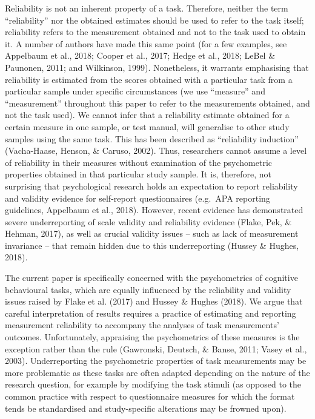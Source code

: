 \documentclass[english,,man,floatsintext]{apa6}
\begin{document}
Reliability is not an inherent property of a task. Therefore, neither the term \enquote{reliability} nor the obtained estimates should be used to refer to the task itself; reliability refers to the measurement obtained and not to the task used to obtain it. A number of authors have made this same point (for a few examples, see Appelbaum et al., 2018; Cooper et al., 2017; Hedge et al., 2018; LeBel \& Paunonen, 2011; and Wilkinson, 1999). Nonetheless, it warrants emphasising that reliability is estimated from the scores obtained with a particular task from a particular sample under specific circumstances (we use \enquote{measure} and \enquote{measurement} throughout this paper to refer to the measurements obtained, and not the task used). We cannot infer that a reliability estimate obtained for a certain measure in one sample, or test manual, will generalise to other study samples using the same task. This has been described as \enquote{reliability induction} (Vacha-Haase, Henson, \& Caruso, 2002). Thus, researchers cannot assume a level of reliability in their measures without examination of the psychometric properties obtained in that particular study sample. It is, therefore, not surprising that psychological research holds an expectation to report reliability and validity evidence for self-report questionnaires (e.g.~APA reporting guidelines, Appelbaum et al., 2018). However, recent evidence has demonstrated severe underreporting of scale validity and reliability evidence (Flake, Pek, \& Hehman, 2017), as well as crucial validity issues -- such as lack of measurement invariance -- that remain hidden due to this underreporting (Hussey \& Hughes, 2018).

The current paper is specifically concerned with the psychometrics of cognitive behavioural tasks, which are equally influenced by the reliability and validity issues raised by Flake et al. (2017) and Hussey \& Hughes (2018). We argue that careful interpretation of results requires a practice of estimating and reporting measurement reliability to accompany the analyses of task measurements' outcomes. Unfortunately, appraising the psychometrics of these measures is the exception rather than the rule (Gawronski, Deutsch, \& Banse, 2011; Vasey et al., 2003). Underreporting the psychometric properties of task measurements may be more problematic as these tasks are often adapted depending on the nature of the research question, for example by modifying the task stimuli (as opposed to the common practice with respect to questionnaire measures for which the format tends be standardised and study-specific alterations may be frowned upon).
\end{document}
